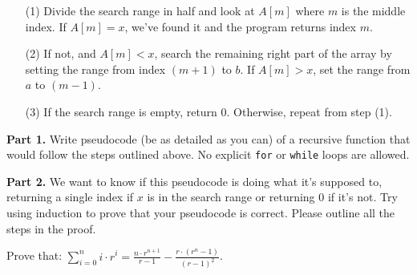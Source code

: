 \documentclass[11pt]{article}
\newif\ifsolutions
\begin{document}
\begin{qunlist}
\begin{figure}[htbp]
\centering
\end{figure}

\begin{itemize}
\item[(1)] Divide the search range in half and look at $A[m]$ where $m$ is the middle index. If $A[m] = x$, we've found it and the program returns index $m$. 
\item[(2)] If not, and $A[m] < x$, search the remaining right part of the array by setting the range from index $(m+1)$ to $b$. If $A[m] > x$, set the range from $a$ to $(m-1)$. 
\item[(3)] If the search range is empty, return 0. Otherwise, repeat from step (1).  
\end{itemize}

\textbf{Part 1.} 
Write pseudocode (be as detailed as you can) of a recursive function that would follow the steps outlined above. No explicit \texttt{for} or \texttt{while} loops are allowed.

\ifsolutions
\textbf{Solution:}

\begin{verbatim}
global array A
global variable x
function binary_search(index_start, index_end):
  if index_end<index_start then return 0
  middle_index = (index_end + index_start) / 2
  if A[middle_index] = x then return middle_index
  if A[middle_index] < x then return binary_search(middle_index+1, index_end)
  if A[middle_index] > x then return binary_search(index_start, middle_index-1)
\end{verbatim}
\fi

\textbf{Part 2.}
We want to know if this pseudocode is doing what it's supposed to, returning a single index if $x$ is in the search range or returning 0 if it's not. Try using induction to prove that your pseudocode is correct. Please outline all the steps in the proof.

\ifsolutions
\textbf{Solution:}
The hypothesis is given to them in the statement. The induction is on the length of the subarray.
For induction basis they need to show lengths of 1 and 2.
For inductive step, they simply first prove that if x is in the array our checks find the correct subarray, and then use induction to show that the algorithm will return the correct answer.
\fi

Prove that: $\sum_{i=0}^n i \cdot r^i = \frac{n \cdot r^{n+1}}{r-1} - \frac{r \cdot (r^n - 1)}{(r-1)^2}$.


\end{qunlist}
\end{document}
